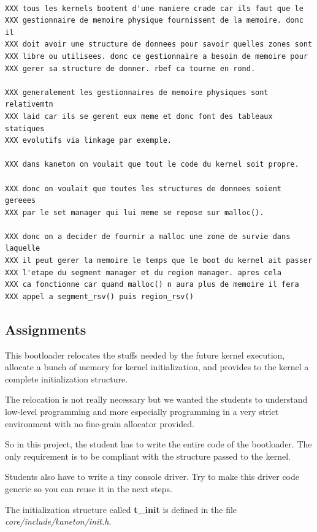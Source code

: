 \begin{verbatim}

XXX tous les kernels bootent d'une maniere crade car ils faut que le
XXX gestionnaire de memoire physique fournissent de la memoire. donc il
XXX doit avoir une structure de donnees pour savoir quelles zones sont
XXX libre ou utilisees. donc ce gestionnaire a besoin de memoire pour
XXX gerer sa structure de donner. rbef ca tourne en rond.

XXX generalement les gestionnaires de memoire physiques sont relativemtn
XXX laid car ils se gerent eux meme et donc font des tableaux statiques
XXX evolutifs via linkage par exemple.

XXX dans kaneton on voulait que tout le code du kernel soit propre.

XXX donc on voulait que toutes les structures de donnees soient gereees
XXX par le set manager qui lui meme se repose sur malloc().

XXX donc on a decider de fournir a malloc une zone de survie dans laquelle
XXX il peut gerer la memoire le temps que le boot du kernel ait passer
XXX l'etape du segment manager et du region manager. apres cela
XXX ca fonctionne car quand malloc() n aura plus de memoire il fera
XXX appel a segment_rsv() puis region_rsv()

\end{verbatim}

%
%

\subsection{Assignments}

This  bootloader relocates  the  stuffs needed  by  the future  kernel
execution, allocate  a bunch of memory for  kernel initialization, and
provides to the kernel a complete initialization structure.

The relocation is not really necessary but we wanted the students
to understand low-level programming and more especially programming
in a very strict environment with no fine-grain allocator provided.

So in this project, the student has to write the entire code of the
bootloader. The only requirement is to be compliant with the structure
passed to the kernel.

Students also  have to write a  tiny console driver. Try  to make this
driver code generic so you can reuse it in the next steps.

The initialization structure called \textbf{t\_init} is defined in the
file \textit{core/include/kaneton/init.h}.

